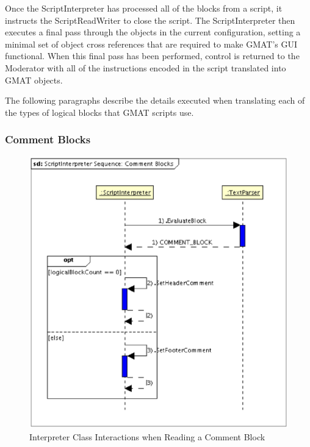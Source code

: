 Once the ScriptInterpreter has processed all of the blocks from a script, it instructs the
ScriptReadWriter to close the script.  The ScriptInterpreter then executes a final pass through the
objects in the current configuration, setting a minimal set of object cross references that are
required to make GMAT's GUI functional.  When this final pass has been performed, control is
returned to the Moderator with all of the instructions encoded in the script translated into GMAT
objects.

The following paragraphs describe the details executed when translating each of the types of
logical blocks that GMAT scripts use.

\subsubsection{Comment Blocks}

\begin{figure}[htb]
\begin{center}
\includegraphics[scale=0.5]{Images/ScriptInterpreterSequenceCommentBlocks.eps}
\caption{\label{figure:InterpreterReadInteractionsCommentBlock}Interpreter Class Interactions when
Reading a Comment Block}
\end{center}
\end{figure}


